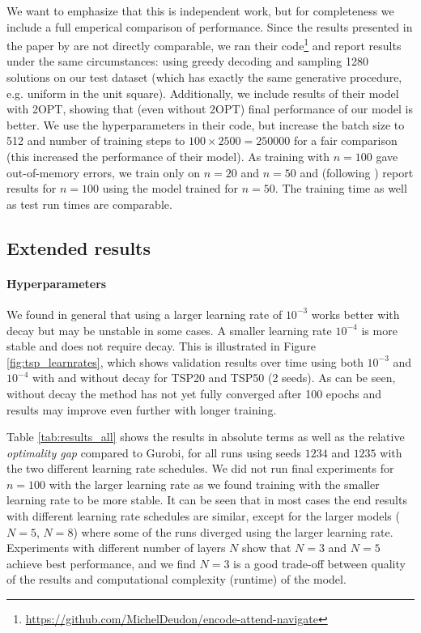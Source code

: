 We want to emphasize that this is independent work, but for completeness we include a full emperical comparison of performance. Since the results presented in the paper by \citet{deudon2018learning} are not directly comparable, we ran their code\footnote{\url{https://github.com/MichelDeudon/encode-attend-navigate}} and report results under the same circumstances: using greedy decoding and sampling 1280 solutions on our test dataset (which has exactly the same generative procedure, e.g. uniform in the unit square). Additionally, we include results of their model with 2OPT, showing that (even without 2OPT) final performance of our model is better. We use the hyperparameters in their code, but increase the batch size to 512 and number of training steps to $100 \times 2500 = 250000$ for a fair comparison (this increased the performance of their model). As training with $n = 100$ gave out-of-memory errors, we train only on $n = 20$ and $n = 50$ and (following \citet{deudon2018learning}) report results for $n = 100$ using the model trained for $n = 50$. The training time as well as test run times are comparable.

\subsection{Extended results}
\label{sec:appendix_results_tsp}

\paragraph{Hyperparameters}
We found in general that using a larger learning rate of $10^{-3}$ works better with decay but may be unstable in some cases. A smaller learning rate $10^{-4}$ is more stable and does not require decay. This is illustrated in Figure \ref{fig:tsp_learnrates}, which shows validation results over time using both $10^{-3}$ and $10^{-4}$ with and without decay for TSP20 and TSP50 (2 seeds). As can be seen, without decay the method has not yet fully converged after 100 epochs and results may improve even further with longer training.

Table \ref{tab:results_all} shows the results in absolute terms as well as the relative \emph{optimality gap} compared to Gurobi, for all runs using seeds $1234$ and $1235$ with the two different learning rate schedules. We did not run final experiments for $n = 100$ with the larger learning rate as we found training with the smaller learning rate to be more stable. It can be seen that in most cases the end results with different learning rate schedules are similar, except for the larger models ($N=5$, $N=8$) where some of the runs diverged using the larger learning rate. Experiments with different number of layers $N$ show that $N=3$ and $N=5$ achieve best performance, and we find $N=3$ is a good trade-off between quality of the results and computational complexity (runtime) of the model.

